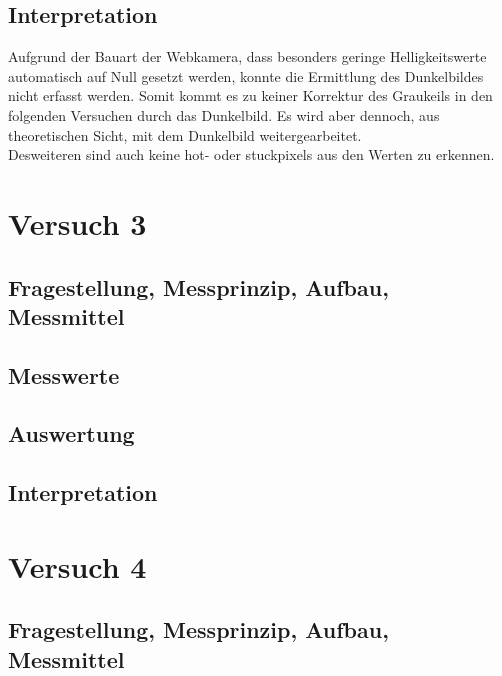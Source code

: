 \documentclass[12pt,oneside,a4paper]{report}
\begin{document}
\section{Interpretation}
\label{chap:VERSUCH_2_INTERPRETATION}
Aufgrund der Bauart der Webkamera, dass besonders geringe Helligkeitswerte automatisch auf Null gesetzt werden, konnte die Ermittlung des Dunkelbildes nicht erfasst werden. Somit kommt es zu keiner Korrektur des Graukeils in den folgenden Versuchen durch das Dunkelbild. Es wird aber dennoch, aus theoretischen Sicht, mit dem Dunkelbild weitergearbeitet.\\
Desweiteren sind auch keine hot- oder stuckpixels aus den Werten zu erkennen.

%
%
\chapter{Versuch 3}
\label{chap:VERSUCH_3}

\section{Fragestellung, Messprinzip, Aufbau, Messmittel}
\label{chap:VERSUCH_3_FRAGESTELLUNG}

\section{Messwerte}
\label{chap:VERSUCH_3_MESSWERTE}

\section{Auswertung}
\label{chap:VERSUCH_3_AUSWERTUNG}

\section{Interpretation}
\label{chap:VERSUCH_3_INTERPRETATION}

%
%
\chapter{Versuch 4}
\label{chap:VERSUCH_4}

\section{Fragestellung, Messprinzip, Aufbau, Messmittel}
\label{chap:VERSUCH_4_FRAGESTELLUNG}
\end{document}
